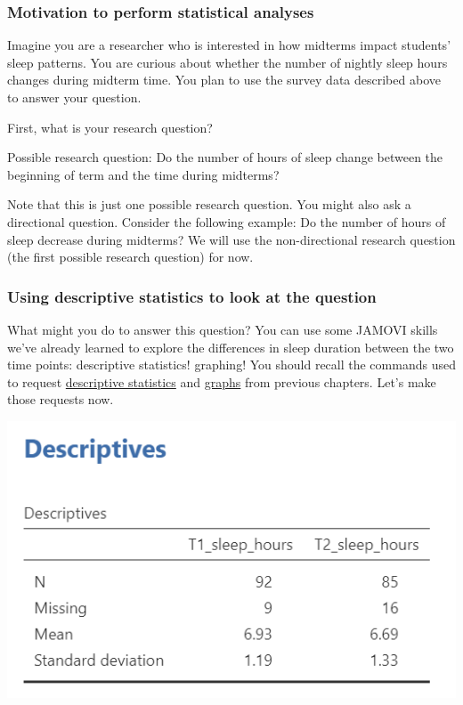 \documentclass[
]{book}
\begin{document}
\hypertarget{motivation-to-perform-statistical-analyses}{%
\subsubsection{Motivation to perform statistical analyses}\label{motivation-to-perform-statistical-analyses}}

Imagine you are a researcher who is interested in how midterms impact students' sleep patterns. You are curious about whether the number of nightly sleep hours changes during midterm time. You plan to use the survey data described above to answer your question.

First, what is your research question?

Possible research question: Do the number of hours of sleep change between the beginning of term and the time during midterms?

Note that this is just one possible research question. You might also ask a directional question. Consider the following example: Do the number of hours of sleep decrease during midterms? We will use the non-directional research question (the first possible research question) for now.

\hypertarget{using-descriptive-statistics-to-look-at-the-question}{%
\subsubsection{Using descriptive statistics to look at the question}\label{using-descriptive-statistics-to-look-at-the-question}}

What might you do to answer this question? You can use some JAMOVI skills we've already learned to explore the differences in sleep duration between the two time points: descriptive statistics! graphing! You should recall the commands used to request \href{https://www.erinmazerolle.com/statisticsLab/lab-2-descriptive-statistics-and-more-graphs.html\#jamovi---week-3---january-24th-25th}{descriptive statistics} and \href{https://www.erinmazerolle.com/statisticsLab/lab-1-graphing-data.html\#jamovi---week-7---february-28th-march-1st}{graphs} from previous chapters. Let's make those requests now.

\includegraphics{img/SleepHours_Descriptives.png}
\end{document}
